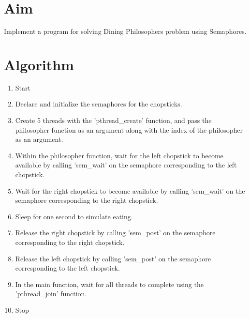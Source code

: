 
\section{Aim}
Implement a program for solving Dining Philosophers problem using Semaphores.

\section{Algorithm}
\begin{enumerate}
   \item Start
   \item Declare and initialize the semaphores for the chopsticks.
   \item Create 5 threads with the 'pthread\_create' function, and pass the philosopher function as an argument along with the index of the philosopher as an argument.
   \item Within the philosopher function, wait for the left chopstick to become available by calling 'sem\_wait' on the semaphore corresponding to the left chopstick.
   \item Wait for the right chopstick to become available by calling 'sem\_wait' on the semaphore corresponding to the right chopstick.
   \item Sleep for one second to simulate eating.
   \item Release the right chopstick by calling 'sem\_post' on the semaphore corresponding to the right chopstick.
   \item Release the left chopstick by calling 'sem\_post' on the semaphore corresponding to the left chopstick.
   \item In the main function, wait for all threads to complete using the 'pthread\_join' function.
   \item Stop
\end{enumerate}

